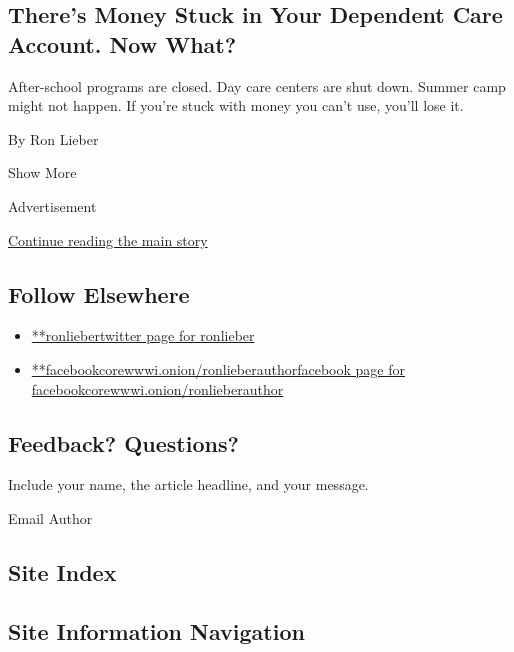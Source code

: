 \begin{enumerate}
  \hypertarget{theres-money-stuck-in-your-dependent-care-account-now-what}{%
  \subsection{There's Money Stuck in Your Dependent Care Account. Now
  What?}\label{theres-money-stuck-in-your-dependent-care-account-now-what}}

  After-school programs are closed. Day care centers are shut down.
  Summer camp might not happen. If you're stuck with money you can't
  use, you'll lose it.

  By Ron Lieber
\end{enumerate}

Show More

Advertisement

\protect\hyperlink{after-mid2}{Continue reading the main story}

\hypertarget{follow-elsewhere}{%
\subsection{Follow Elsewhere}\label{follow-elsewhere}}

\begin{itemize}
\tightlist
\item
  \href{https://twitter.com/ronlieber}{**ronliebertwitter page for
  ronlieber}
\item
  \href{https://www.facebookcorewwwi.onion/facebookcorewwwi.onion/ronlieberauthor}{**facebookcorewwwi.onion/ronlieberauthorfacebook
  page for facebookcorewwwi.onion/ronlieberauthor}
\end{itemize}

\hypertarget{feedback-questions}{%
\subsection{Feedback? Questions?}\label{feedback-questions}}

Include your name, the article headline, and your message.

Email Author

\hypertarget{site-index}{%
\subsection{Site Index}\label{site-index}}

\hypertarget{site-information-navigation}{%
\subsection{Site Information
Navigation}\label{site-information-navigation}}

